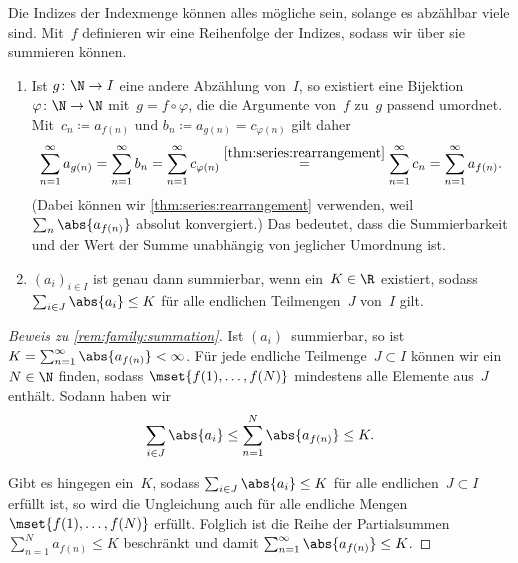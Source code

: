 \documentclass[a4paper]{article}
\begin{document}
Die Indizes der Indexmenge können alles mögliche sein, solange es abzählbar viele sind. Mit~$f$ definieren wir eine Reihenfolge der Indizes, sodass wir über sie summieren können.

\begin{remark}\leavevmode
    \begin{enumerate}
        \item Ist $g\colon \N\to I$ eine andere Abzählung von~$I$, so existiert eine Bijektion~$\varphi\colon \N\to\N$ mit~$g = f\circ\varphi$, die die Argumente von~$f$ zu~$g$ passend umordnet. Mit~$c_n \coloneqq a_{f(n)}$ und $b_n \coloneqq a_{g(n)} = c_{\varphi(n)}$ gilt daher
              \begin{equation*}
                  \sum_{n=1}^\infty a_{g(n)} = \sum_{n=1}^\infty b_n = \sum_{n=1}^\infty c_{\varphi(n)} \overset{\eqref{thm:series:rearrangement}}{=} \sum_{n=1}^\infty c_n = \sum_{n=1}^\infty a_{f(n)}.
              \end{equation*}
              (Dabei können wir \cref{thm:series:rearrangement} verwenden, weil $\sum_n \abs{a_{f(n)}}$ absolut konvergiert.) Das bedeutet, dass die Summierbarkeit und der Wert der Summe unabhängig von jeglicher Umordnung ist.
        \item $(a_i)_{i\in I}$ ist genau dann summierbar, wenn ein~$K \in \R$ existiert, sodass $\sum_{i\in J} \abs{a_i} \leq K$ für alle endlichen Teilmengen~$J$ von~$I$ gilt.\label{rem:family:summation}
    \end{enumerate}
\end{remark}

\begin{proof}[Beweis zu \cref{rem:family:summation}]
    Ist $(a_i)$~summierbar, so ist $K = \sum_{n=1}^\infty \abs{a_{f(n)}} < \infty$. Für jede endliche Teilmenge~$J \subset I$ können wir ein~$N \in \N$ finden, sodass $\mset{f(1),\dots,f(N)}$ mindestens alle Elemente aus~$J$ enthält. Sodann haben wir
    \begin{equation*}
        \sum_{i\in J} \abs{a_i} \leq \sum_{n=1}^N \abs{a_{f(n)}} \leq K.
    \end{equation*}

    Gibt es hingegen ein~$K$, sodass $\sum_{i\in J} \abs{a_i} \leq K$ für alle endlichen~$J \subset I$ erfüllt ist, so wird die Ungleichung auch für alle endliche Mengen $\mset{f(1),\dots,f(N)}$ erfüllt. Folglich ist die Reihe der Partialsummen $\sum_{n=1}^N a_{f(n)} \leq K$ beschränkt und damit $\sum_{n=1}^\infty \abs{a_{f(n)}} \leq K$.
\end{proof}
\end{document}
